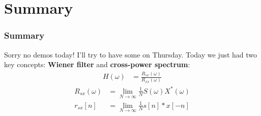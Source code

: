 \documentclass{beamer}
\begin{document}
\section[Summary]{Summary}
\setcounter{subsection}{1}

\begin{frame}
  \frametitle{Summary}

  Sorry no demos today!  I'll try to have some on Thursday.  Today we
  just had two key concepts: {\bf Wiener filter} and {\bf cross-power
    spectrum}:
  \begin{align*}
    H(\omega)  &= \frac{R_{sx}(\omega)}{R_{xx}(\omega)}
  \end{align*}
  \begin{align*}
    R_{sx}(\omega)&=\lim_{N\rightarrow\infty}\frac{1}{N} S(\omega)X^*(\omega)\\
    r_{sx}[n] &=\lim_{N\rightarrow\infty}\frac{1}{N} s[n]\ast x[-n]
  \end{align*}
\end{frame}
\end{document}

